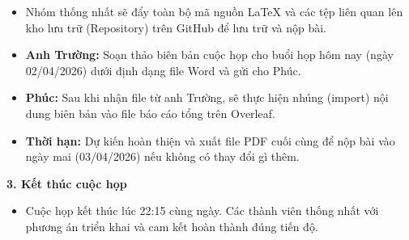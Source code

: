 \documentclass[12pt,a4paper]{article}
\begin{document}
\begin{itemize}
    \item Nhóm thống nhất sẽ đẩy toàn bộ mã nguồn LaTeX và các tệp liên quan lên kho lưu trữ (Repository) trên GitHub để lưu trữ và nộp bài.
\end{itemize}

\begin{itemize}[leftmargin=3.3em]
    \item[o] \textbf{Anh Trường:} Soạn thảo biên bản cuộc họp cho buổi họp hôm nay (ngày 02/04/2026) dưới định dạng file Word và gửi cho Phúc.
    \item[o] \textbf{Phúc:} Sau khi nhận file từ anh Trường, sẽ thực hiện nhúng (import) nội dung biên bản vào file báo cáo tổng trên Overleaf.
    \item[o] \textbf{Thời hạn:} Dự kiến hoàn thiện và xuất file PDF cuối cùng để nộp bài vào ngày mai (03/04/2026) nếu không có thay đổi gì thêm.
\end{itemize}

\vspace{2pt}
\textbf{3. Kết thúc cuộc họp}
\begin{itemize}
    \item Cuộc họp kết thúc lúc 22:15 cùng ngày. Các thành viên thống nhất với phương án triển khai và cam kết hoàn thành đúng tiến độ.
\end{itemize}

\label{LastPageGeny03} 
\end{document}
